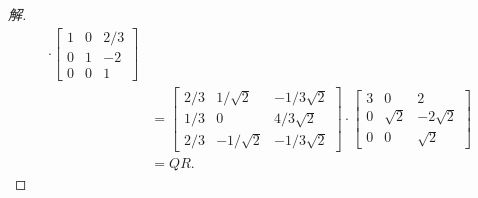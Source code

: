 \documentclass[UTF8]{ctexart}
\begin{document}
\begin{proof}[解]
\begin{align*}
  \cdot
  \begin{bmatrix}
    1 & 0 & 2/3 \\
    0 & 1 & -2 \\
    0 & 0 & 1
  \end{bmatrix} \\
  &=
    \begin{bmatrix}
      2/3 & 1/\sqrt{2} &  -1/3\sqrt{2} \\
      1/3 & 0          &  4/3\sqrt{2} \\
      2/3 & -1/\sqrt{2} &  -1/3\sqrt{2}
    \end{bmatrix}
    \cdot
    \begin{bmatrix}
      3 & 0 & 2 \\
      0 & \sqrt{2} & -2\sqrt{2} \\
      0 & 0 & \sqrt{2}
    \end{bmatrix} \\
  &=QR.
\end{align*}
\end{proof}
\end{document}

